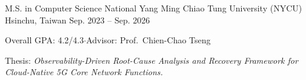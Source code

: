 

\begin{cventries}

  \cventry
    {M.S. in Computer Science} %
    {National Yang Ming Chiao Tung University (NYCU)} %
    {Hsinchu, Taiwan} %
    {Sep. 2023 -- Sep. 2026} %
    {
      \begin{cvitems} %
        \item {Overall GPA: 4.2/4.3\enskip$\cdot$\enskip Advisor: Prof.~Chien-Chao Tseng}
        \item {Thesis: \textit{Observability-Driven Root-Cause Analysis and Recovery Framework for Cloud-Native 5G Core Network Functions.}}
      \end{cvitems}
    }

\end{cventries}

